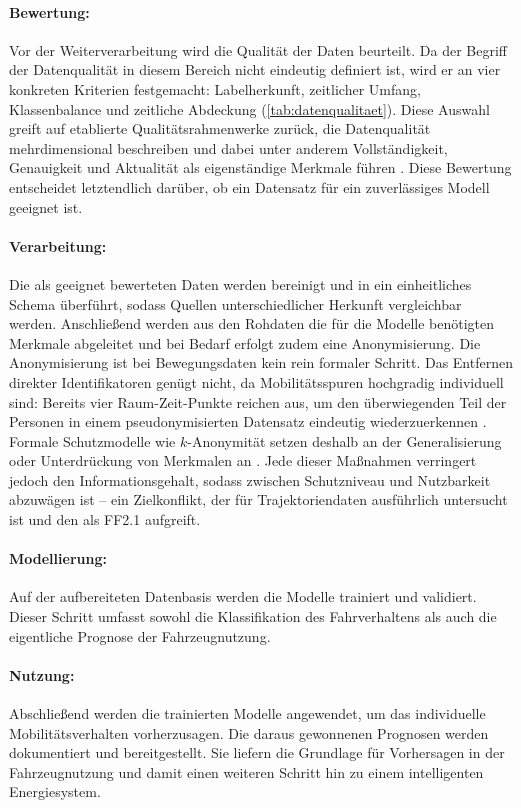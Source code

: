 \paragraph{Bewertung:}
Vor der Weiterverarbeitung wird die Qualität der Daten beurteilt. Da der Begriff der Datenqualität in diesem Bereich nicht eindeutig definiert ist, wird er an vier konkreten Kriterien festgemacht: Labelherkunft, zeitlicher Umfang, Klassenbalance und zeitliche Abdeckung (\cref{tab:datenqualitaet}). Diese Auswahl greift auf etablierte Qualitätsrahmenwerke zurück, die Datenqualität mehrdimensional beschreiben und dabei unter anderem Vollständigkeit, Genauigkeit und Aktualität als eigenständige Merkmale führen \parencite{wang1996beyond,batini2009methodologies}. Diese Bewertung entscheidet letztendlich darüber, ob ein Datensatz für ein zuverlässiges Modell geeignet ist.

\paragraph{Verarbeitung:}
Die als geeignet bewerteten Daten werden bereinigt und in ein einheitliches Schema überführt, sodass Quellen unterschiedlicher Herkunft vergleichbar werden. Anschließend werden aus den Rohdaten die für die Modelle benötigten Merkmale abgeleitet und bei Bedarf erfolgt zudem eine Anonymisierung. 
Die Anonymisierung ist bei Bewegungsdaten kein rein formaler Schritt. Das Entfernen direkter Identifikatoren genügt nicht, da Mobilitätsspuren hochgradig individuell sind: Bereits vier Raum-Zeit-Punkte reichen aus, um den überwiegenden Teil der Personen in einem pseudonymisierten Datensatz eindeutig wiederzuerkennen \parencite{demontjoye2013unique}. Formale Schutzmodelle wie $k$-Anonymität setzen deshalb an der Generalisierung oder Unterdrückung von Merkmalen an \parencite{sweeney2002kanonymity}. Jede dieser Maßnahmen verringert jedoch den Informationsgehalt, sodass zwischen Schutzniveau und Nutzbarkeit abzuwägen ist -- ein Zielkonflikt, der für Trajektoriendaten ausführlich untersucht ist \parencite{fiore2020privacy} und den  als FF2.1 aufgreift. 
\paragraph{Modellierung:}
Auf der aufbereiteten Datenbasis werden die Modelle trainiert und validiert. Dieser Schritt umfasst sowohl die Klassifikation des Fahrverhaltens als auch die eigentliche Prognose der Fahrzeugnutzung.

\paragraph{Nutzung:}
Abschließend werden die trainierten Modelle angewendet, um das individuelle Mobilitätsverhalten vorherzusagen. Die daraus gewonnenen Prognosen werden dokumentiert und bereitgestellt. Sie liefern die Grundlage für Vorhersagen in der Fahrzeugnutzung und damit einen weiteren Schritt hin zu einem intelligenten Energiesystem.


